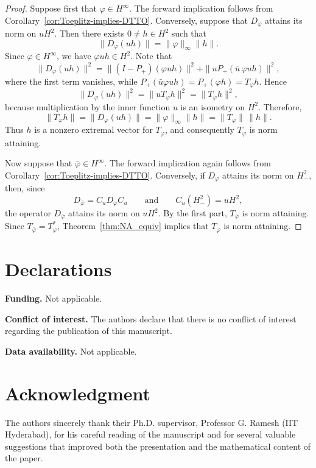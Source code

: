 \documentclass[12pt]{amsart}
\theoremstyle{definition}
\theoremstyle{remark}
\newcommand{\vp}{\varphi}
\numberwithin{equation}{section}
\begin{document}
\begin{proof}
Suppose first that $\vp\in H^\infty$. The forward implication follows
from Corollary~\ref{cor:Toeplitz-implies-DTTO}. Conversely, suppose
that $D_\vp$ attains its norm on $uH^2$. Then there exists $0\neq h\in H^2$ such that
\[
\|D_\vp(uh)\|=\|\vp\|_\infty\|h\|.
\]
Since $\vp\in H^\infty$, we have $\vp uh\in H^2$. Note that
\[
\|D_\vp(uh)\|^2 = \|(I-P_{+})(\vp uh)\|^2 +\|uP_{+}(\bar u\,\vp uh)\|^2,
\]
 where the first term vanishes, while $P_{+}(\bar{u}\vp uh) = P_{+}(\vp h)=T_\vp h$. Hence
\[
\|D_\vp(uh)\|^2 = \|uT_\vp h\|^2 = \|T_\vp h\|^2,
\]
because multiplication by the inner function $u$ is an isometry on
$H^2$. Therefore,
\[
\|T_\vp h\|=\|D_\vp(uh)\|=\|\vp\|_\infty\|h\|=\|T_\vp\|\,\|h\|.
\]
Thus $h$ is a nonzero extremal vector for $T_\vp$, and consequently
$T_\vp$ is norm attaining.
	
Now suppose that $\bar{\vp}\in H^\infty$. The forward implication again follows from Corollary~\ref{cor:Toeplitz-implies-DTTO}. Conversely, if $D_\vp$ attains its norm on $H^2_{-}$, then, since
\[
D_{\bar{\vp}}=C_uD_\vp C_u \qquad\text{and}\qquad C_u(H^2_{-})=uH^2,
\]
the operator $D_{\bar{\vp}}$ attains its norm on $uH^2$. By the first
part, $T_{\bar{\vp}}$ is norm attaining. Since $T_{\bar{\vp}}=T_\vp^*$, Theorem~\ref{thm:NA_equiv} implies that	$T_\vp$ is norm attaining.
\end{proof}









\section*{Declarations}

\noindent\textbf{Funding.}
Not applicable.

\medskip

\noindent\textbf{Conflict of interest.}
The authors declare that there is no conflict of interest regarding the publication of this manuscript.

\medskip


\noindent\textbf{Data availability.}
Not applicable.


	



\section*{Acknowledgment}
The authors sincerely thank their Ph.D. supervisor, Professor G. Ramesh (IIT Hyderabad), for his careful reading of the manuscript and for several valuable suggestions that improved both the presentation and the mathematical content of the paper.
\end{document}
